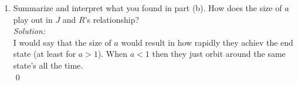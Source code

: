 \documentclass[10pt]{amsart}
\theoremstyle{nonumberplain}
\begin{document}
\begin{enumerate}[label={\bf {\arabic*}:}]
\begin{enumerate}
\begin{enumerate}
\end{enumerate}

\item Summarize and interpret what you found in part (b).
How does the size of $a$ play out in $J$ and $R$’s relationship? \\
\textit{Solution:} \\
I would say that the size of $a$ would result in how rapidly they achiev the end state (at least for $a > 1$).
When $a < 1$ then they just orbit around the same state's all the time. \\
\qed \\

\end{enumerate}

\end{enumerate}
\end{document}
